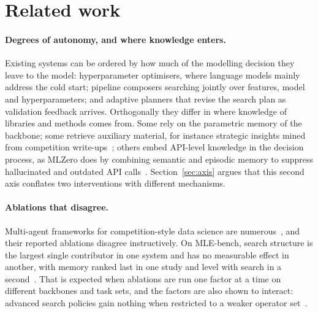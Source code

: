 \section{Related work}
\label{sec:related}

\paragraph{Degrees of autonomy, and where knowledge enters.} Existing systems can
be ordered by how much of the modelling decision they leave to the model:
hyperparameter optimisers, where language models mainly address the cold start;
pipeline composers searching jointly over features, model and hyperparameters;
and adaptive planners that revise the search plan as validation feedback arrives.
Orthogonally they differ in where knowledge of libraries and methods comes from.
Some rely on the parametric memory of the backbone; some retrieve auxiliary
material, for instance strategic insights mined from competition
write-ups~\citep{kulibaba2025kompeteai}; others embed API-level knowledge in the
decision process, as MLZero does by combining semantic and episodic memory to
suppress hallucinated and outdated API calls~\citep{fang2025mlzero}.
Section~\ref{sec:axis} argues that this second axis conflates two interventions
with different mechanisms.

\paragraph{Ablations that disagree.} Multi-agent frameworks for competition-style
data science are
numerous~\citep{li2024autokaggle,trirat2025automlagent,kulibaba2025kompeteai,fang2025mlzero},
and their reported ablations disagree instructively. On MLE-bench, search
structure is the largest single contributor in one system and has no measurable
effect in another, with memory ranked last in one study and level with search in
a second~\citep{toledo2025aira}. That is expected when ablations are run one
factor at a time on different backbones and task sets, and the factors are also
shown to interact: advanced search policies gain nothing when restricted to a
weaker operator set~\citep{toledo2025aira}.

